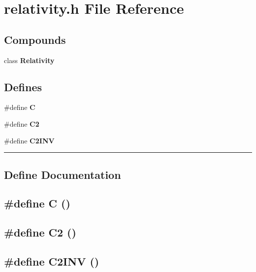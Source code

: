 \section{relativity.h File Reference}
\label{relativity.h}


\subsection*{Compounds}
\begin{CompactItemize}
\item 
class {\bf Relativity}
\end{CompactItemize}
\subsection*{Defines}
\begin{CompactItemize}
\item 
\#define {\bf C}
\item 
\#define {\bf C2}
\item 
\#define {\bf C2INV}
\end{CompactItemize}
\vspace{0.4cm}\hrule\vspace{0.2cm}
\subsection*{Define Documentation}
\label{relativity.h_a0}
\subsection{\setlength{\rightskip}{0pt plus 5cm}\#define C ()}

\label{relativity.h_a1}
\subsection{\setlength{\rightskip}{0pt plus 5cm}\#define C2 ()}

\label{relativity.h_a2}
\subsection{\setlength{\rightskip}{0pt plus 5cm}\#define C2INV ()}

